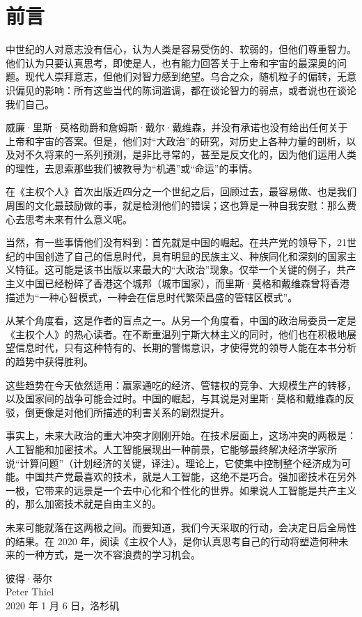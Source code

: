 \thispagestyle{empty}
\chapter*{前言}

中世纪的人对意志没有信心，认为人类是容易受伤的、软弱的，但他们尊重智力。他们认为只要认真思考，即使是人，也有能力回答关于上帝和宇宙的最深奥的问题。现代人崇拜意志，但他们对智力感到绝望。乌合之众，随机粒子的偏转，无意识偏见的影响：所有这些当代的陈词滥调，都在谈论智力的弱点，或者说也在谈论我们自己。


威廉·里斯·莫格勋爵和詹姆斯·戴尔·戴维森，并没有承诺也没有给出任何关于上帝和宇宙的答案。但是，他们对“大政治”的研究，对历史上各种力量的剖析，以及对不久将来的一系列预测，是非比寻常的，甚至是反文化的，因为他们运用人类的理性，去思索那些我们被教导为“机遇”或“命运”的事情。


在《主权个人》首次出版近四分之一个世纪之后，回顾过去，最容易做、也是我们周围的文化最鼓励做的事，就是检测他们的错误；这也算是一种自我安慰：那么费心去思考未来有什么意义呢。


当然，有一些事情他们没有料到：首先就是中国的崛起。在共产党的领导下，21世纪的中国创造了自己的信息时代，具有明显的民族主义、种族同化和深刻的国家主义特征。这可能是该书出版以来最大的“大政治”现象。仅举一个关键的例子，共产主义中国已经粉碎了香港这个城邦（城市国家），而里斯·莫格和戴维森曾将香港描述为“一种心智模式，一种会在信息时代繁荣昌盛的管辖区模式”。

从某个角度看，这是作者的盲点之一。从另一个角度看，中国的政治局委员一定是《主权个人》的热心读者。在不断重温列宁斯大林主义的同时，他们也在积极地展望信息时代，只有这种特有的、长期的警惕意识，才使得党的领导人能在本书分析的趋势中获得胜利。


这些趋势在今天依然适用：赢家通吃的经济、管辖权的竞争、大规模生产的转移，以及国家间的战争可能会过时。中国的崛起，与其说是对里斯·莫格和戴维森的反驳，倒更像是对他们所描述的利害关系的剧烈提升。


事实上，未来大政治的重大冲突才刚刚开始。在技术层面上，这场冲突的两极是：人工智能和加密技术。人工智能展现出一种前景，它能够最终解决经济学家所说“计算问题”（计划经济的关键，译注）。理论上，它使集中控制整个经济成为可能。中国共产党最喜欢的技术，就是人工智能，这绝不是巧合。强加密技术在另外一极，它带来的远景是一个去中心化和个性化的世界。如果说人工智能是共产主义的，那么加密技术就是自由主义的。


未来可能就落在这两极之间。而要知道，我们今天采取的行动，会决定日后全局性的结果。在 2020 年，阅读《主权个人》，是你认真思考自己的行动将塑造何种未来的一种方式，是一次不容浪费的学习机会。

\begin{flushright}
\kaishu 彼得·蒂尔\\
Peter Thiel\\
2020 年 1 月 6 日，洛杉矶
\end{flushright} 

\let\cleardoublepage\clearpage